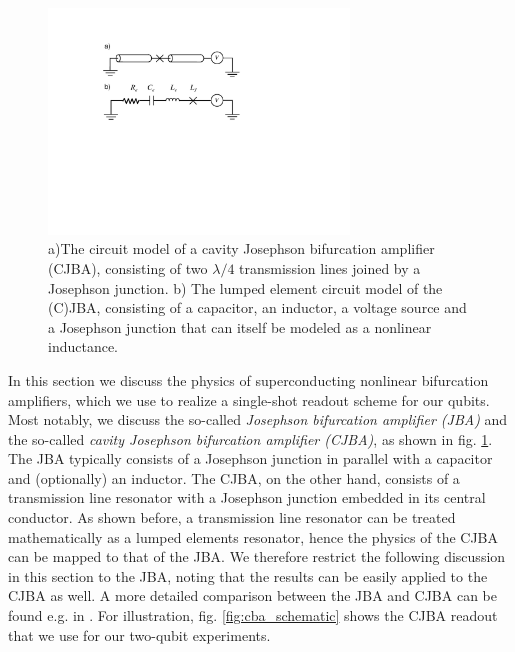 \begin{figure}
	\includegraphics[width=8cm]{"./material/figures/introduction/nonlinear resonator"}
	\caption{a)The circuit model of a cavity Josephson bifurcation amplifier (CJBA), consisting of two $\lambda/4$ transmission lines joined by a Josephson junction. b) The lumped element circuit model of the (C)JBA, consisting of a capacitor, an inductor, a voltage source and  a Josephson junction that can itself be modeled as a nonlinear inductance.}
	\label{fig:jba_schematic}
\end{figure}

In this section we discuss the physics of superconducting nonlinear bifurcation amplifiers, which we use to realize a single-shot readout scheme for our qubits. Most notably, we discuss the so-called {\it Josephson bifurcation amplifier (JBA)} and the so-called {\it cavity Josephson bifurcation amplifier (CJBA)}, as shown in fig. \ref{fig:jba_schematic}. The JBA typically consists of a Josephson junction in parallel with a capacitor and (optionally) an inductor. The CJBA, on the other hand, consists of a transmission line resonator with a Josephson junction embedded in its central conductor. As shown before, a transmission line resonator can be treated mathematically as a lumped elements resonator, hence the physics of the CJBA can be mapped to that of the JBA. We therefore restrict the following discussion in this section to the JBA, noting that the results can be easily applied to the CJBA as well. A more detailed comparison between the JBA and CJBA can be found e.g. in \cite{palacios-laloy_superconducting_2010}. For illustration, fig. \ref{fig:cba_schematic} shows the CJBA readout that we use for our two-qubit experiments. 


